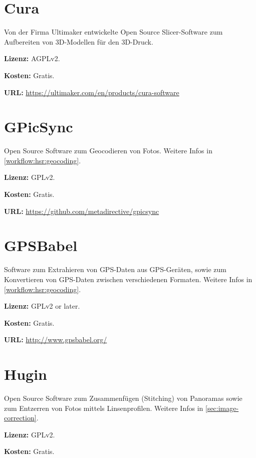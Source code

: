 {%

\section{Cura}

Von der Firma Ultimaker entwickelte Open Source Slicer-Software zum Aufbereiten
von 3D-Modellen für den 3D-Druck.

\textbf{Lizenz:} AGPLv2.

\textbf{Kosten:} Gratis.

\textbf{URL:} \url{https://ultimaker.com/en/products/cura-software}


\section{GPicSync}

Open Source Software zum Geocodieren von Fotos. Weitere Infos in
\autoref{workflow:hsr:geocoding}.

\textbf{Lizenz:} GPLv2.

\textbf{Kosten:} Gratis.

\textbf{URL:} \url{https://github.com/metadirective/gpicsync}


\section{GPSBabel}

Software zum Extrahieren von GPS-Daten aus GPS-Geräten, sowie zum Konvertieren
von GPS-Daten zwischen verschiedenen Formaten. Weitere Infos in
\autoref{workflow:hsr:geocoding}.

\textbf{Lizenz:} GPLv2 or later.

\textbf{Kosten:} Gratis.

\textbf{URL:} \url{http://www.gpsbabel.org/}


\section{Hugin}

Open Source Software zum Zusammenfügen (Stitching) von Panoramas sowie zum
Entzerren von Fotos mittels Linsenprofilen. Weitere Infos in
\autoref{sec:image-correction}.

\textbf{Lizenz:} GPLv2.

\textbf{Kosten:} Gratis.

}
